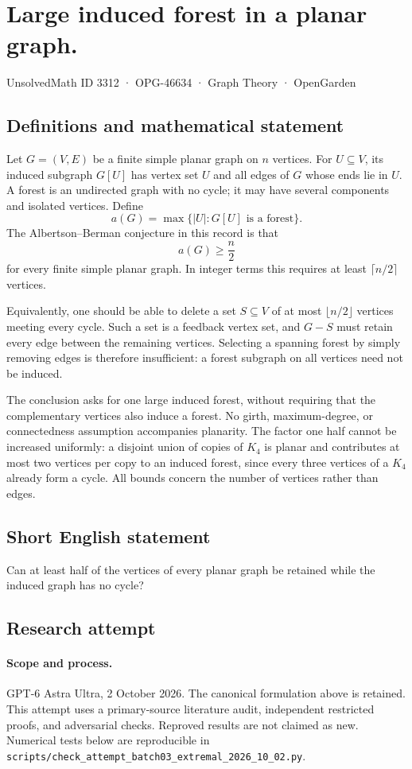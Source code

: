 \documentclass[11pt,a4paper]{article}
\begin{document}
\section*{Large induced forest in a planar graph.}\label{3312}
{\small UnsolvedMath ID 3312 · OPG-46634 · Graph Theory · OpenGarden}
\subsection{Definitions and mathematical statement}
Let $G=(V,E)$ be a finite simple planar graph on $n$ vertices. For
$U\subseteq V$, its induced subgraph $G[U]$ has vertex set $U$ and
all edges of $G$ whose ends lie in $U$. A forest is an undirected
graph with no cycle; it may have several components and isolated
vertices. Define
\[
                      a(G)=\max\{|U|:G[U]\text{ is a forest}\}.
\]
The Albertson--Berman conjecture in this record is that
\[
                                a(G)\ge\frac n2
\]
for every finite simple planar graph. In integer terms this requires
at least $\lceil n/2\rceil$ vertices.

Equivalently, one should be able to delete a set $S\subseteq V$ of
at most $\lfloor n/2\rfloor$ vertices meeting every cycle. Such a set
is a feedback vertex set, and $G-S$ must retain every edge between
the remaining vertices. Selecting a spanning forest by simply
removing edges is therefore insufficient: a forest subgraph on all
vertices need not be induced.

The conclusion asks for one large induced forest, without requiring
that the complementary vertices also induce a forest. No girth,
maximum-degree, or connectedness assumption accompanies planarity.
The factor one half cannot be increased uniformly: a disjoint union
of copies of $K_4$ is planar and contributes at most two vertices
per copy to an induced forest, since every three vertices of a
$K_4$ already form a cycle. All bounds concern the number of
vertices rather than edges.
\subsection{Short English statement}
Can at least half of the vertices of every planar graph be retained while the induced graph has no cycle?
\subsection{Research attempt}
\paragraph{Scope and process.}
GPT-6 Astra Ultra, 2 October 2026. The canonical formulation above is retained. This attempt uses a primary-source literature audit, independent restricted proofs, and adversarial checks. Reproved results are not claimed as new. Numerical tests below are reproducible in \texttt{scripts/check\_attempt\_batch03\_extremal\_2026\_10\_02.py}.
\end{document}
